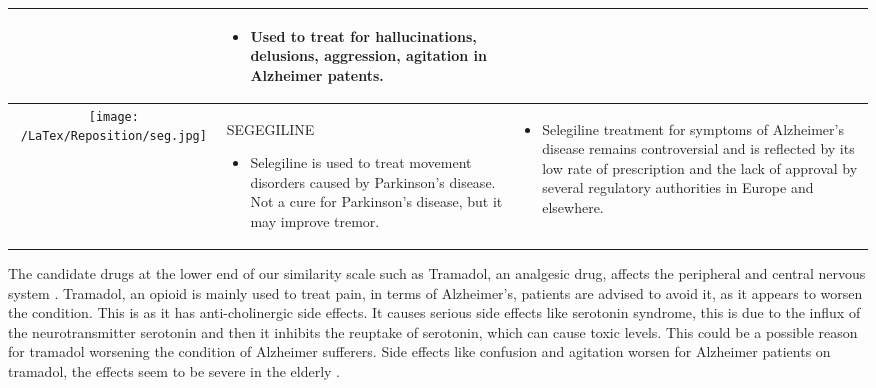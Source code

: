 \documentclass[preprint,11pt]{elsarticle}
\begin{document}
\begin{table}[h!]
\begin{tabular}{ | c | m{4.5cm} | m{4.5cm} | }
\begin{itemize}
      \end{itemize}
    & 
      \begin{itemize}
        \item Used to treat for hallucinations, delusions, aggression, agitation in Alzheimer patents.
            \end{itemize}
    \\ \hline
     \begin{minipage}{.3\textwidth}
      \texttt{[image: /LaTex/Reposition/seg.jpg]}
    \end{minipage}
    & SEGEGILINE
      \begin{itemize}
        \item Selegiline  is used to treat movement disorders caused by Parkinson's disease. Not a cure for Parkinson's disease, but it may improve tremor.

      \end{itemize}
    & 
      \begin{itemize}
        \item Selegiline treatment for symptoms of Alzheimer's disease remains controversial and is reflected by its low rate of prescription and the lack of approval by several regulatory authorities in Europe and elsewhere. 
            \end{itemize}
    \\ \hline
  \end{tabular}
 \end{table}
\normalsize

The candidate drugs at the lower end of our similarity scale such as Tramadol, an analgesic drug, affects the peripheral and central nervous system \cite{Minami2015}. Tramadol, an opioid is mainly used to treat pain,  in terms of Alzheimer's, patients are advised to avoid it, as it appears to worsen the condition.  This is as it has anti-cholinergic side effects. It causes serious side effects like serotonin syndrome, this is due to the influx of the neurotransmitter serotonin and then it inhibits the reuptake of serotonin, which can cause toxic levels. This could be a possible reason for tramadol worsening the condition of Alzheimer sufferers. Side effects like confusion and agitation worsen for Alzheimer patients on tramadol, the effects seem to be severe in the elderly \cite{Vazzana2015}.
\end{document}
